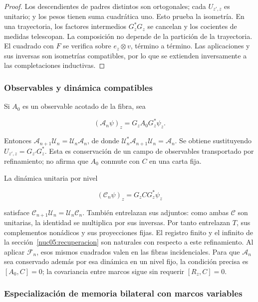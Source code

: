 \begin{proof}
Los descendientes de padres distintos son ortogonales; cada \(U_{z',z}\) es unitario; y los pesos tienen suma cuadrática uno. Esto prueba la isometría. En una trayectoria, los factores intermedios \(G_z^*G_z\) se cancelan y los cocientes de medidas telescopan. La composición no depende de la partición de la trayectoria. El cuadrado con \(F\) se verifica sobre \(e_z\otimes v\), término a término. Las aplicaciones y sus inversas son isometrías compatibles, por lo que se extienden inversamente a las completaciones inductivas.
\end{proof}

\subsubsection{Observables y dinámica compatibles}

Si \(A_0\) es un observable acotado de la fibra, sea

\[
(\mathscr A_n\psi)_z=G_zA_0G_z^*\psi_z.
\]

Entonces \(\mathscr A_{n+1}\mathscr U_n=\mathscr U_n\mathscr A_n\), de donde \(\mathscr U_n^*\mathscr A_{n+1}\mathscr U_n=\mathscr A_n\). Se obtiene sustituyendo \(U_{z',z}=G_{z'}G_z^*\). Esta es conservación de un campo de observables transportado por refinamiento; no afirma que \(A_0\) conmute con \(C\) en una carta fija.

La dinámica unitaria por nivel

\[
(\mathscr C_n\psi)_z=G_zCG_z^*\psi_z
\]

satisface \(\mathscr C_{n+1}\mathscr U_n=\mathscr U_n\mathscr C_n\). También entrelazan sus adjuntos: como ambas \(\mathscr C\) son unitarias, la identidad se multiplica por sus inversas. Por tanto entrelazan \(T\), sus complementos nonádicos y sus proyecciones fijas. El registro finito y el infinito de la sección~\ref{nuc05:recuperacion} son naturales con respecto a este refinamiento. Al aplicar \(\mathscr F_n\), esos mismos cuadrados valen en las fibras incidenciales. Para que \(\mathscr A_n\) sea conservado además por esa dinámica en un nivel fijo, la condición precisa es \([A_0,C]=0\); la covariancia entre marcos sigue sin requerir \([R_z,C]=0\).

\subsubsection{Especialización de memoria bilateral con marcos variables}

